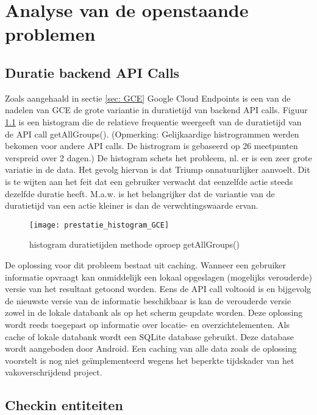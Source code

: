 
\chapter{Analyse van de openstaande problemen}%

\section{Duratie backend API Calls}

Zoals aangehaald in sectie \ref{sec: GCE} Google Cloud Endpoints is een van de nadelen van GCE de grote variantie in duratietijd van backend API calls. Figuur \ref{fig:hist_getAllGroups} is een histogram die de relatieve frequentie weergeeft van de duratietijd van de API call getAllGroups(). (Opmerking: Gelijkaardige histrogrammen werden bekomen voor andere API calls. De histrogram is gebaseerd op 26 meetpunten verspreid over 2 dagen.) De histogram schets het probleem, nl. er is een zeer grote variatie in de data. Het gevolg hiervan is dat Triump onnatuurlijker aanvoelt. Dit is te wijten aan het feit dat een gebruiker verwacht dat eenzelfde actie steeds dezelfde duratie heeft. M.a.w. is het belangrijker dat de variantie van de duratietijd van een actie kleiner is dan de verwchtingswaarde ervan.

\begin{figure}[H]
	\centering
	\texttt{[image: prestatie\_histogram\_GCE]}
	\caption{histogram duratietijden methode oproep getAllGroups()}
	\label{fig:hist_getAllGroups}
\end{figure}

De oplossing voor dit probleem bestaat uit caching. Wanneer een gebruiker informatie opvraagt kan onmiddelijk een lokaal opgeslagen (mogelijks verouderde) versie van het resultaat getoond worden. Eens de API call voltooid is en bijgevolg de nieuwste versie van de informatie beschikbaar is kan de verouderde versie zowel in de lokale databank als op het scherm geupdate worden. Deze oplossing wordt reeds toegepast op informatie over locatie- en overzichtelementen. Als cache of lokale databank wordt een SQLite database gebruikt. Deze database wordt aangeboden door Android. Een caching van alle data zoals de oplossing voorstelt is nog niet geïmplementeerd wegens het beperkte tijdskader van het vakoverschrijdend project.

\section{Checkin entiteiten}

